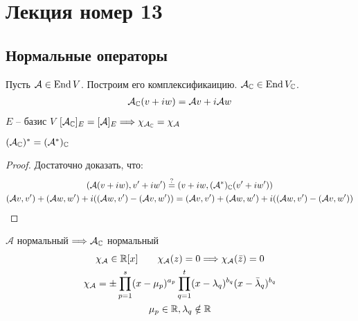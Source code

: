 \section{Лекция номер 13}
\subsection*{Нормальные операторы}
Пусть $\mathcal{A} \in \operatorname{End}{V}$. Построим его комплексификаицию. 
$\mathcal{A}_{\mathbb{C}} \in \operatorname{End}{V_{\mathbb{C}}}$. 
\begin{gather*}
    \mathcal{A}_{\mathbb{C}}(v + iw) = \mathcal{A}v + i \mathcal{A} w
\end{gather*}
$E$ -- базис $V$ \qquad $[\mathcal{A}_{\mathbb{C}}]_E = [\mathcal{A}]_E \Longrightarrow \chi_{\mathcal{A}_{\mathbb{C}}} = \chi_{\mathcal{A}}$ 

\begin{lemma}
    $(\mathcal{A}_{\mathbb{C}})^* = (\mathcal{A}^*)_{\mathbb{C}}$
\end{lemma}
\begin{proof}
    Достаточно доказать, что: 
    \begin{gather*}
        (\mathcal{A}(v + iw), v' + i w') \overset{?}{=} (v + iw, (\mathcal{A}^*)_{\mathbb{C}} (v' + iw')) \\
        (\mathcal{A} v, v') + (\mathcal{A} w, w') + i ((\mathcal{A}w, v') - (\mathcal{A} v, w')) = 
        (\mathcal{A} v, v') + (\mathcal{A} w, w') + i ((\mathcal{A}w, v') - (\mathcal{A} v, w'))
    \end{gather*}
\end{proof}
\follow $\mathcal{A}$ нормальный $\Longrightarrow \mathcal{A}_{\mathbb{C}}$ нормальный
\begin{gather*}
    \chi_{\mathcal{A}} \in \mathbb{R}[x] \qquad \chi_{\mathcal{A}} (z) = 0 \Longrightarrow \chi_\mathcal{A} (\bar z) = 0 \\
    \chi_\mathcal{A} = \pm \prod\limits_{p=1}^s (x - \mu_p)^{a_p} \prod\limits_{q = 1}^t (x - \lambda_q)^{b_q} (x - \bar \lambda_q)^{b_q} \\
    \mu_p \in \mathbb{R}, \lambda_q \notin \mathbb{R}
\end{gather*}

